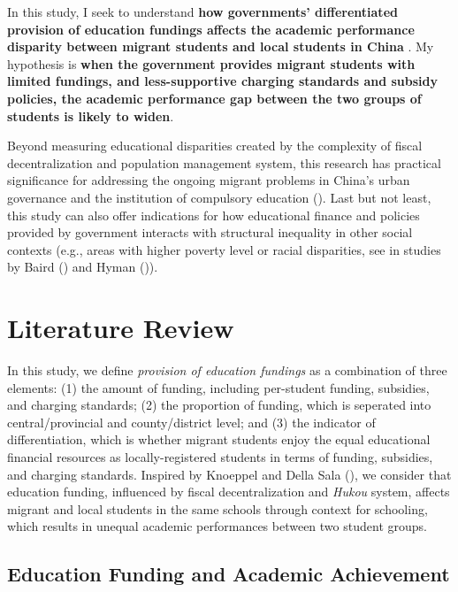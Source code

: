 \documentclass[
  man,
  floatsintext,
  longtable,
  nolmodern,
  notxfonts,
  notimes,
  colorlinks=true,linkcolor=blue,citecolor=blue,urlcolor=blue]{apa7}
\begin{document}
In this study, I seek to understand \textbf{how governments'
differentiated provision of education fundings affects the academic
performance disparity between migrant students and local students in
China} . My hypothesis is \textbf{when the government provides migrant
students with limited fundings, and less-supportive charging standards
and subsidy policies, the academic performance gap between the two
groups of students is likely to widen}.

Beyond measuring educational disparities created by the complexity of
fiscal decentralization and population management system, this research
has practical significance for addressing the ongoing migrant problems
in China's urban governance and the institution of compulsory education
(). Last but not least, this
study can also offer indications for how educational finance and
policies provided by government interacts with structural inequality in
other social contexts (e.g., areas with higher poverty level or racial
disparities, see in studies by Baird
() and Hyman
()).

\section{Literature Review}\label{literature-review}

In this study, we define \emph{provision of education fundings} as a
combination of three elements: (1) the amount of funding, including
per-student funding, subsidies, and charging standards; (2) the
proportion of funding, which is seperated into central/provincial and
county/district level; and (3) the indicator of differentiation, which
is whether migrant students enjoy the equal educational financial
resources as locally-registered students in terms of funding, subsidies,
and charging standards. Inspired by Knoeppel and Della Sala
(), we consider
that education funding, influenced by fiscal decentralization and
\emph{Hukou} system, affects migrant and local students in the same
schools through context for schooling, which results in unequal academic
performances between two student groups.

\subsection{Education Funding and Academic
Achievement}\label{education-funding-and-academic-achievement}
\end{document}
